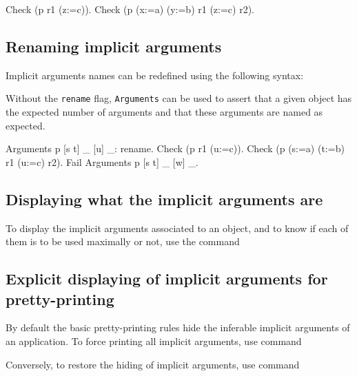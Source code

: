 \begin{coq_example}
Check (p r1 (z:=c)).
Check (p (x:=a) (y:=b) r1 (z:=c) r2).
\end{coq_example}

\subsection{Renaming implicit arguments
}

Implicit arguments names can be redefined using the following syntax:
\begin{quote}
{}
\end{quote}

Without the {\tt rename} flag, {\tt Arguments} can be used to assert
that a given object has the expected number of arguments and that
these arguments are named as expected.

\begin{coq_example}
Arguments p [s t] _ [u] _: rename.
Check (p r1 (u:=c)).
Check (p (s:=a) (t:=b) r1 (u:=c) r2).
Fail Arguments p [s t] _ [w] _.
\end{coq_example}


\subsection{Displaying what the implicit arguments are
\label{PrintImplicit}}

To display the implicit arguments associated to an object, and to know
if each of them is to be used maximally or not, use the command
\begin{quote}
{}
\end{quote}

\subsection{Explicit displaying of implicit arguments for pretty-printing
}

By default the basic pretty-printing rules hide the inferable implicit
arguments of an application. To force printing all implicit arguments,
use command
\begin{quote}
{}
\end{quote}
Conversely, to restore the hiding of implicit arguments, use command
\begin{quote}
{}
\end{quote}

